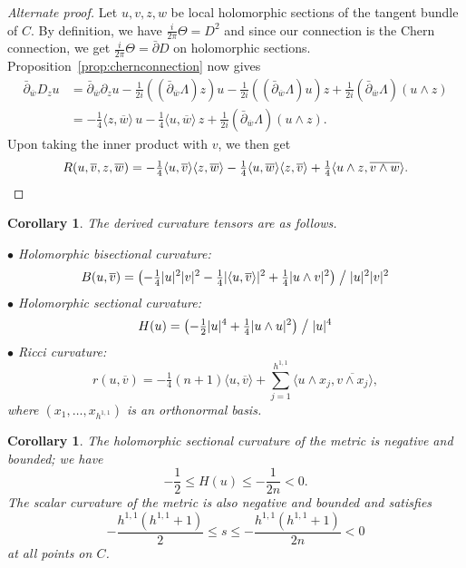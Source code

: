 \documentclass[11pt,a4paper]{amsart}
\newtheorem{coro}[theo]{Corollary}
\theoremstyle{definition}
\theoremstyle{remark}
\def\ov#1{\overline{#1}}
\def\d{\partial}
\def\dbar{\bar\partial}
\def\met#1#2{\langle #1, \ov{#2} \rangle}
\def\Lef{\Lambda}
\def\chern{D}
\def\curv{\tfrac{i}{2\pi}\Theta}
\def\ton{u}
\def\ttw{v}
\def\tth{z}
\def\tfo{w}
\def\KC{C}
\begin{document}
\begin{proof}[Alternate proof]
Let $\ton,\ttw,\tth,\tfo$ be local holomorphic sections of the tangent
bundle of $\KC$.  By definition, we have $\curv = \chern^2$ and since
our connection is the Chern connection, we get $\curv = \dbar \chern$ on
holomorphic sections. Proposition~\ref{prop:chernconnection} now gives
\begin{align*}
\dbar_{\ov\tfo} \chern_{\tth} \ton
&=
\dbar_{\ov\tfo} \d_{\tth}\ton
- \tfrac{1}{2i} ((\dbar_{\ov\tfo}\Lef) \tth)\ton
- \tfrac{1}{2i} ((\dbar_{\ov\tfo}\Lef) \ton)\tth
+ \tfrac{1}{2i} (\dbar_{\ov\tfo}\Lef)(\ton\wedge\tth)
\\
&=
- \tfrac{1}{4} \langle \tth,\ov{\tfo} \rangle\, \ton
- \tfrac{1}{4} \langle \ton, \ov{\tfo} \rangle\, \tth
+ \tfrac{1}{2i} (\dbar_{\ov\tfo}\Lef)(\ton \wedge \tth).
\end{align*}
Upon taking the inner product with $\ttw$, we then get
$$
R(\ton,\ov\ttw,\tth,\ov\tfo)
= -\tfrac14
\langle \ton, \ov\ttw \rangle
\langle \tth,\ov{\tfo} \rangle
-\tfrac14
\langle \ton, \ov{\tfo} \rangle
\langle \tth, \ov\ttw \rangle
+ \tfrac{1}{4} \langle \ton \wedge \tth, \ov{\ttw \wedge \tfo}\rangle.
\qedhere
$$
\end{proof}


\begin{coro}
The derived curvature tensors are as follows.

\smallskip
\noindent
$\bullet$
Holomorphic bisectional curvature:
$$
B(\ton,\ov\ttw) 
= 
\bigl(-\tfrac14 |\ton|^2 |\ttw|^2
- \tfrac14 |\met{\ton}{\ttw}|^2
+ \tfrac14 |\ton \wedge \ttw|^2
\bigr)
\bigm/
|\ton|^2|\ttw|^2
$$
\smallskip
\noindent
$\bullet$
Holomorphic sectional curvature:
$$
H(\ton) 
=
\bigl(
-\tfrac12 |\ton|^4
+\tfrac14 |\ton \wedge \ton|^2
\bigr)
\bigm/
|\ton|^4
$$
\smallskip
\noindent
$\bullet$
Ricci curvature:
$$
r(\ton, \ov\ttw) 
=
-\tfrac14(n+1) \met{\ton}{\ttw}
+ \sum_{j=1}^{h^{1,1}} \met{\ton\wedge x_j}{\ttw \wedge x_j},
$$
where $(x_1,\ldots,x_{h^{1,1}})$ is an orthonormal basis.
\end{coro}

\begin{coro}
The holomorphic sectional curvature of the metric is negative and
bounded; we have
$$
-\frac12 \leq H(\ton) \leq -\frac{1}{2n} < 0.
$$
The scalar curvature of the metric is also negative and bounded and
satisfies 
$$
-\frac{h^{1,1}(h^{1,1}+1)}{2} \leq s \leq -\frac{h^{1,1}(h^{1,1}+1)}{2n} < 0
$$
at all points on $\KC$.
\end{coro}
\end{document}

